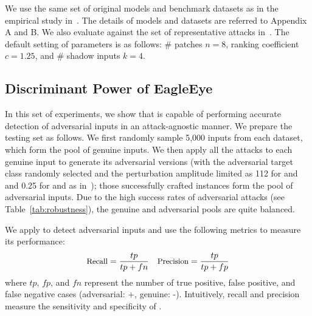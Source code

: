 We use the same set of original \dnn models and benchmark datasets as in the empirical study in~. The details of \dnn models and datasets are referred to Appendix A and B. We also evaluate \system against the set of representative attacks in~. The default setting of parameters is as follows: \# patches $n = 8$, ranking coefficient $c = 1.25$, and \# shadow inputs $k = 4$.




\subsection{Discriminant Power of EagleEye}
\label{sec:sec1}

In this set of experiments, we show that \system is capable of performing accurate detection of adversarial inputs in an  attack-agnostic manner. We prepare the testing set as follows. We first randomly sample 5,000 inputs from each dataset, which form the pool of genuine inputs. We then apply all the attacks to each genuine input to generate its adversarial versions (with the adversarial target class randomly selected and the perturbation amplitude limited as 112 for \ttp and \ttca and 0.25 for \ttg and \ttha as in~\cite{Goodfellow:2014:arxiv,Papernot:2016:sp}); those successfully crafted instances form the pool of adversarial inputs. Due to the high success rates of adversarial attacks (see Table~\ref{tab:robustness}), the genuine and adversarial pools are quite balanced.


We apply \system to detect adversarial inputs and use the following metrics to measure its performance:
\begin{displaymath}
\textrm{\small Recall} = \frac{tp}{tp + fn}  \quad \textrm{\small Precision} =  \frac{tp}{tp + fp}
\end{displaymath}
where $tp$, $fp$, and $fn$ represent the number of true positive, false positive, and false negative cases (adversarial: +, genuine: -). Intuitively, recall and precision measure the sensitivity and specificity of \system.



